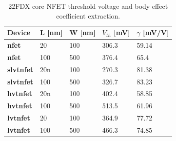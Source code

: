 			\begin{table}[htb!]
				\centering
				\def\arraystretch{1.5}		
				\setlength\arrayrulewidth{1pt}
				\setlength{\tabcolsep}{1em} %
				\fontfamily{\sfdefault}\selectfont 
				\begin{tabular}{|l|l|l|l|l|}	
					\hline 
					\rule[-1ex]{0pt}{2.5ex} \cellcolor{gray!40}\textbf{Device} & \cellcolor{gray!40}\textbf{L [nm]} & \cellcolor{gray!40}\textbf{W [nm]} & \cellcolor{gray!40}\textbf{$V_{th}$ [mV]} & \cellcolor{gray!40}\textbf{$\gamma$ [mV/V]}\\ 
					\hline 
					\rule[-1ex]{0pt}{2.5ex} \textbf{nfet} & 20 & 100 & 306.3 & 59.14 \\ 
					\hline 
					\rule[-1ex]{0pt}{2.5ex} \textbf{nfet} & 100 & 500 & 376.4 & 65.4 \\ 
					\hline 
					\rule[-1ex]{0pt}{2.5ex} \textbf{slvtnfet} & 20n & 100 & 270.3 & 81.38 \\ 
					\hline 
					\rule[-1ex]{0pt}{2.5ex} \textbf{slvtnfet} & 100 & 500 & 326.7 & 83.23 \\ 
					\hline 
					\rule[-1ex]{0pt}{2.5ex} \textbf{hvtnfet} & 20n & 100 & 402.4 & 58.85 \\ 
					\hline 
					\rule[-1ex]{0pt}{2.5ex} \textbf{hvtnfet} & 100 & 500 & 513.5 & 61.96 \\ 
					\hline 
					\rule[-1ex]{0pt}{2.5ex} \textbf{lvtnfet} & 20 & 100 & 364.9 & 77.72 \\ 
					\hline 
					\rule[-1ex]{0pt}{2.5ex} \textbf{lvtnfet} & 100 & 500 & 466.3 & 74.85 \\ 
					\hline 
				\end{tabular} 
				\caption{22FDX core NFET threshold voltage and body effect coefficient extraction.}
				\label{tab:nfet_vth_gamma}
			\end{table} 

